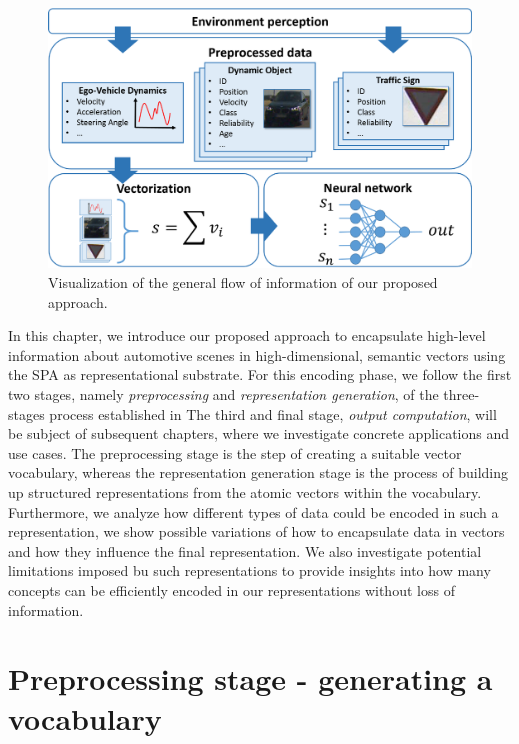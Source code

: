 \begin{figure}[t]
    \centering
    \includegraphics[width=0.8\linewidth]{imgs/system_overview_horizontal.eps}
    \caption{Visualization of the general flow of information of our proposed approach.}
    \label{fig:vectorization}
\end{figure}

In this chapter, we introduce our proposed approach to encapsulate high-level information about automotive scenes in high-dimensional, semantic vectors using the \ac{SPA} as representational substrate.
For this encoding phase, we follow the first two stages, namely \emph{preprocessing} and \emph{representation generation}, of the three-stages process established in \cite{Gallant2013} 
The third and final stage, \emph{output computation}, will be subject of subsequent chapters, where we investigate concrete applications and use cases.
The preprocessing stage is the step of creating a suitable vector vocabulary, whereas the representation generation stage is the process of building up structured representations from the atomic vectors within the vocabulary.
Furthermore, we analyze how different types of data could be encoded in such a representation, we show possible variations of how to encapsulate data in vectors and how they influence the final representation.
We also investigate potential limitations imposed bu such representations to provide insights into how many concepts can be efficiently encoded in our representations without loss of information.  


\section{Preprocessing stage - generating a vocabulary}%
\label{sec:preprocessing_stage_generating_a_vocabulary}


